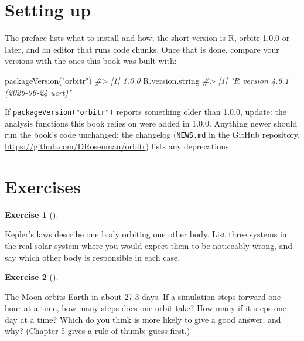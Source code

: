 \documentclass[
  10.5pt,
  letterpaper,
]{scrbook}
\newenvironment{Shaded}{\begin{snugshade}}{\end{snugshade}}
\newcommand{\CommentTok}[1]{\textcolor[rgb]{0.00,0.00,0.00}{\textit{#1}}}
\newcommand{\FunctionTok}[1]{\textcolor[rgb]{0.00,0.00,0.00}{#1}}
\newcommand{\NormalTok}[1]{\textcolor[rgb]{0.00,0.00,0.00}{#1}}
\newcommand{\StringTok}[1]{\textcolor[rgb]{0.00,0.00,0.00}{#1}}
\theoremstyle{definition}
\newtheorem{exercise}{Exercise}[chapter]
\theoremstyle{plain}
\theoremstyle{remark}
\begin{document}
\section{Setting up}\label{setting-up}

The preface lists what to install and how; the short version is R,
orbitr 1.0.0 or later, and an editor that runs code chunks. Once that is
done, compare your versions with the ones this book was built with:

\begin{Shaded}
\begin{Highlighting}[]
\FunctionTok{packageVersion}\NormalTok{(}\StringTok{"orbitr"}\NormalTok{)}
\CommentTok{\#\textgreater{} [1] \textquotesingle{}1.0.0\textquotesingle{}}
\NormalTok{R.version.string}
\CommentTok{\#\textgreater{} [1] "R version 4.6.1 (2026{-}06{-}24 ucrt)"}
\end{Highlighting}
\end{Shaded}

If \texttt{packageVersion("orbitr")} reports something older than 1.0.0,
update: the analysis functions this book relies on were added in 1.0.0.
Anything newer should run the book's code unchanged; the changelog
(\texttt{NEWS.md} in the GitHub repository,
\url{https://github.com/DRosenman/orbitr}) lists any deprecations.

\section*{Exercises}\label{exercises}


\begin{exercise}[]\protect\hypertarget{exr-ch1-three-body}{}\label{exr-ch1-three-body}

Kepler's laws describe one body orbiting one other body. List three
systems in the real solar system where you would expect them to be
noticeably wrong, and say which other body is responsible in each case.

\end{exercise}

\begin{exercise}[]\protect\hypertarget{exr-ch1-step}{}\label{exr-ch1-step}

The Moon orbits Earth in about 27.3 days. If a simulation steps forward
one hour at a time, how many steps does one orbit take? How many if it
steps one day at a time? Which do you think is more likely to give a
good answer, and why? (Chapter 5 gives a rule of thumb; guess first.)

\end{exercise}
\end{document}
